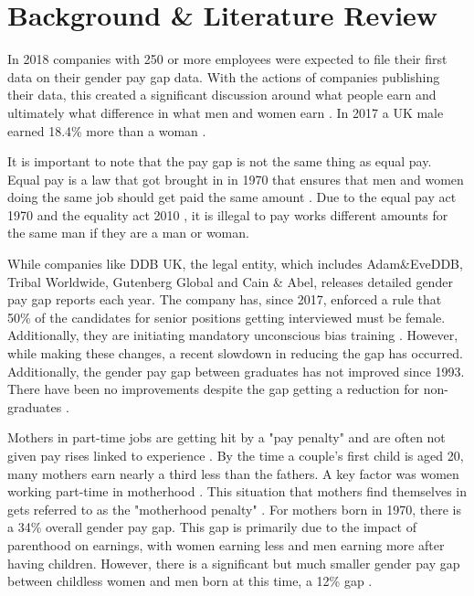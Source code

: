\documentclass{sigchi}
\begin{document}
\section{Background \& Literature Review}
	In 2018 companies with 250 or more employees were expected to file their first data on their gender pay gap data. With the actions of companies publishing their data, this created a significant discussion around what people earn and ultimately what difference in what men and women earn \cite{bbc_gender_pay_gap}. In 2017 a UK male earned 18.4\% more than a woman \cite{ons_gender_pay_gap_17}. 
	
	It is important to note that the pay gap is not the same thing as equal pay. Equal pay is a law that got brought in in 1970 that ensures that men and women doing the same job should get paid the same amount \cite{bbc_gender_pay_gap}. Due to the equal pay act 1970 \cite{equal_pay_act_1070} and the equality act 2010 \cite{equal_act_2010}, it is illegal to pay works different amounts for the same man if they are a man or woman.
	
	While companies like DDB UK, the legal entity, which includes Adam\&EveDDB, Tribal Worldwide, Gutenberg Global and Cain \& Abel, releases detailed gender pay gap reports each year. The company has, since 2017, enforced a rule that 50\% of the candidates for senior positions getting interviewed must be female. Additionally, they are initiating mandatory unconscious bias training \cite{uk_gender_gap}. However, while making these changes, a recent slowdown in reducing the gap has occurred. Additionally, the gender pay gap between graduates has not improved since 1993. There have been no improvements despite the gap getting a reduction for non-graduates \cite{bbc_mothers_suffering}.
	
	Mothers in part-time jobs are getting hit by a "pay penalty" and are often not given pay rises linked to experience \cite{bbc_mothers_suffering}.
	By the time a couple's first child is aged 20, many mothers earn nearly a third less than the fathers. A key factor was women working part-time in motherhood \cite{ifs_mothers_suffer}. This situation that mothers find themselves in gets referred to as the "motherhood penalty" \cite{tuc_motherhood}. For mothers born in 1970, there is a 34\% overall gender pay gap. This gap is primarily due to the impact of parenthood on earnings, with women earning less and men earning more after having children. However, there is a significant but much smaller gender pay gap between childless women and men born at this time, a 12\% gap \cite{tuc_motherhood}.
	
\end{document}
